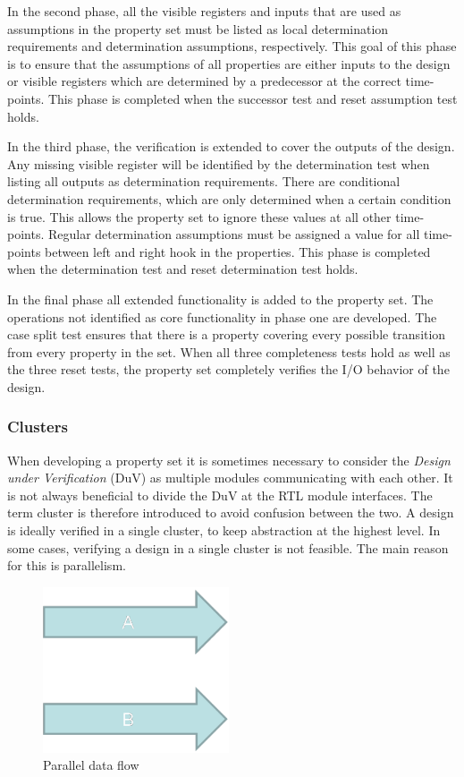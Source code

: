 In the second phase, all the visible registers and inputs that are used as assumptions in the property set must be listed as local determination requirements and determination assumptions, respectively. This goal of this phase is to ensure that the assumptions of all properties are either inputs to the design or visible registers which are determined by a predecessor at the correct time-points. This phase is completed when the successor test and reset assumption test holds. \par
In the third phase, the verification is extended to cover the outputs of the design. Any missing visible register will be identified by the determination test when listing all outputs as determination requirements. There are conditional determination requirements, which are only determined when a certain condition is true. This allows the property set to ignore these values at all other time-points. Regular determination assumptions must be assigned a value for all time-points between left and right hook in the properties. This phase is completed when the determination test and reset determination test holds. \par
In the final phase all extended functionality is added to the property set. The operations not identified as core functionality in phase one are developed. The case split test ensures that there is a property covering every possible transition from every property in the set. When all three completeness tests hold as well as the three reset tests, the property set completely verifies the I/O behavior of the design.  


\subsubsection{Clusters}
\label{sub:clust}
When developing a property set it is sometimes necessary to consider the \textit{Design under Verification} (DuV) as multiple modules communicating with each other. It is not always beneficial to divide the DuV at the RTL module interfaces. The term cluster is therefore introduced to avoid confusion between the two. A design is ideally verified in a single cluster, to keep abstraction at the highest level. In some cases, verifying a design in a single cluster is not feasible. The main reason for this is parallelism.\\ 
\begin{figure}
\includegraphics[width=5.5cm]{figs/Verif/parallell.png}
\caption{Parallel data flow}\label{fig:para}
\end{figure} 


